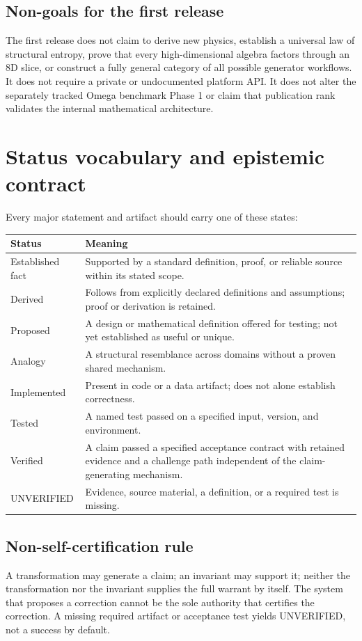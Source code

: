 \documentclass[11pt,oneside]{article}
\newcommand{\UNVERIFIED}{\textsf{UNVERIFIED}}
\begin{document}
\subsection{Non-goals for the first release}
The first release does not claim to derive new physics, establish a universal law of structural entropy, prove that every high-dimensional algebra factors through an 8D slice, or construct a fully general category of all possible generator workflows. It does not require a private or undocumented platform API. It does not alter the separately tracked Omega benchmark Phase 1 or claim that publication rank validates the internal mathematical architecture.

\section{Status vocabulary and epistemic contract}
Every major statement and artifact should carry one of these states:
\begin{longtable}{p{}p{}}
\toprule
\textbf{Status} & \textbf{Meaning} \\
\midrule
Established fact & Supported by a standard definition, proof, or reliable source within its stated scope. \\
Derived & Follows from explicitly declared definitions and assumptions; proof or derivation is retained. \\
Proposed & A design or mathematical definition offered for testing; not yet established as useful or unique. \\
Analogy & A structural resemblance across domains without a proven shared mechanism. \\
Implemented & Present in code or a data artifact; does not alone establish correctness. \\
Tested & A named test passed on a specified input, version, and environment. \\
Verified & A claim passed a specified acceptance contract with retained evidence and a challenge path independent of the claim-generating mechanism. \\
\UNVERIFIED & Evidence, source material, a definition, or a required test is missing. \\
\bottomrule
\end{longtable}

\subsection{Non-self-certification rule}
A transformation may generate a claim; an invariant may support it; neither the transformation nor the invariant supplies the full warrant by itself. The system that proposes a correction cannot be the sole authority that certifies the correction. A missing required artifact or acceptance test yields \UNVERIFIED, not a success by default.
\end{document}
